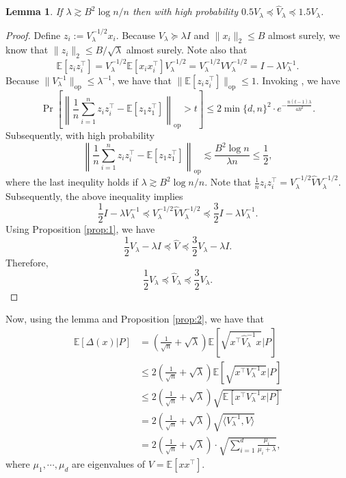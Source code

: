 \documentclass[11pt,a4paper]{article}
\renewcommand{\hat}{\widehat}
\theoremstyle{definition}
\theoremstyle{plain}
\newtheorem{lemma}{Lemma}[section]
\theoremstyle{remark}
\newcommand{\op}{\mathrm{op}}
\begin{document}
\begin{lemma}
If $\lambda\gtrsim B^2\log n/n$ then with high probability $0.5V_\lambda\preceq \hat V_\lambda\preceq 1.5 V_\lambda$.
\end{lemma}
\begin{proof}
Define $z_i := V_\lambda^{-1/2}x_i$. Because $V_\lambda\succeq\lambda I$ and $\|x_i\|_2\leq B$ almost surely, we know that $\|z_i\|_2\leq B/\sqrt{\lambda}$ almost surely.
Note also that
$$
\mathbb E[z_iz_i^\top] = V_\lambda^{-1/2}\mathbb E[x_ix_i^\top]V_\lambda^{-1/2} = V_\lambda^{-1/2}V V_{\lambda}^{-1/2} = I - \lambda V_\lambda^{-1}.
$$
Because $\|V_\lambda^{-1}\|_\op\leq\lambda^{-1}$, we have that $\|\mathbb E[z_iz_i^\top]\|_\op\leq 1$. 
Invoking \cite[Lemma 1]{oliveira2010sums}, we have 
$$
\Pr\left[\left\|\frac{1}{n}\sum_{i=1}^n z_iz_i^\top - \mathbb E[z_1z_1^\top]\right\|_\op >t\right]\leq 2\min\{d,n\}^2\cdot e^{-\frac{n(t-1)\lambda}{4B^2}}.
$$
Subsequently, with high probability
$$
\left\|\frac{1}{n}\sum_{i=1}^n z_iz_i^\top - \mathbb E[z_1z_1^\top]\right\|_\op \lesssim \frac{B^2\log n}{\lambda n} \leq \frac{1}{2},
$$
where the last inequlity holds if $\lambda\gtrsim B^2\log n/n$.
Note that $\frac{1}{n}z_iz_i^\top = V_\lambda^{-1/2}\hat V V_{\lambda}^{-1/2}$. Subsequently, the above inequality implies
$$
 \frac{1}{2} I - \lambda V_\lambda^{-1} \preceq V_\lambda^{-1/2}\hat V V_\lambda^{-1/2} \preceq \frac{3}{2}I - \lambda V_\lambda^{-1}.
$$
Using Proposition \ref{prop:1}, we have
$$
\frac{1}{2}V_\lambda - \lambda I \preceq \hat V \preceq \frac{3}{2}V_\lambda - \lambda I.
$$
Therefore, 
$$
\frac{1}{2}V_\lambda \preceq \hat V_\lambda \preceq \frac{3}{2}V_\lambda.
$$
\end{proof}

Now, using the lemma and Proposition \ref{prop:2}, we have that
\begin{align*}
\mathbb E[\Delta(x)|P] &= \left(\frac{1}{\sqrt{n}}+\sqrt{\lambda}\right) \mathbb E\left[\sqrt{x^\top\hat V_\lambda^{-1} x}|P\right]\\
&\leq 2\left(\frac{1}{\sqrt{n}}+\sqrt{\lambda}\right) \mathbb E\left[\sqrt{x^\top V_\lambda^{-1} x}|P\right]\\
&\leq 2\left(\frac{1}{\sqrt{n}}+\sqrt{\lambda}\right)\sqrt{\mathbb E[x^\top V_\lambda^{-1} x|P]}\\
&= 2\left(\frac{1}{\sqrt{n}}+\sqrt{\lambda}\right)\sqrt{\langle V_\lambda^{-1},V\rangle}\\
&= 2\left(\frac{1}{\sqrt{n}}+\sqrt{\lambda}\right)\cdot \sqrt{\sum_{i=1}^d\frac{\mu_i}{\mu_i+\lambda}},
\end{align*}
where $\mu_1,\cdots,\mu_d$ are eigenvalues of $V=\mathbb E[xx^\top]$.
\end{document}
